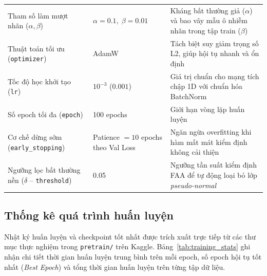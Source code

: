 \documentclass[sigconf,nonacm]{acmart}
\begin{document}
\begin{table}[t]
\begin{tabularx}{\textwidth}{llX}
Tham số làm mượt nhãn ($\alpha, \beta$) & $\alpha = 0.1,\; \beta = 0.01$ & Kháng bất thường giả ($\alpha$) và bao vây mẫu ô nhiễm nhãn trong tập train ($\beta$) \\
Thuật toán tối ưu (\texttt{optimizer}) & AdamW & Tách biệt suy giảm trọng số L2, giúp hội tụ nhanh và ổn định \\
Tốc độ học khởi tạo (\texttt{lr}) & $10^{-3}$ ($0.001$) & Giá trị chuẩn cho mạng tích chập 1D với chuẩn hóa BatchNorm \\
Số epoch tối đa (\texttt{epoch}) & 100 epochs & Giới hạn vòng lặp huấn luyện \\
Cơ chế dừng sớm (\texttt{early\_stopping}) & Patience $= 10$ epochs theo Val Loss & Ngăn ngừa overfitting khi hàm mất mát kiểm định không cải thiện \\
Ngưỡng lọc bất thường nền ($\delta$ -- \texttt{threshold}) & 0.05 & Ngưỡng tần suất kiểm định FAA để tự động loại bỏ lớp \textit{pseudo-normal} \\
\bottomrule
\end{tabularx}
\end{table}

\subsection{Thống kê quá trình huấn luyện}

Nhật ký huấn luyện và checkpoint tốt nhất được trích xuất trực tiếp từ các thư mục thực nghiệm trong \texttt{pretrain/} trên Kaggle. Bảng~\ref{tab:training_stats} ghi nhận chi tiết thời gian huấn luyện trung bình trên mỗi epoch, số epoch hội tụ tốt nhất (\textit{Best Epoch}) và tổng thời gian huấn luyện trên từng tập dữ liệu.
\end{document}
